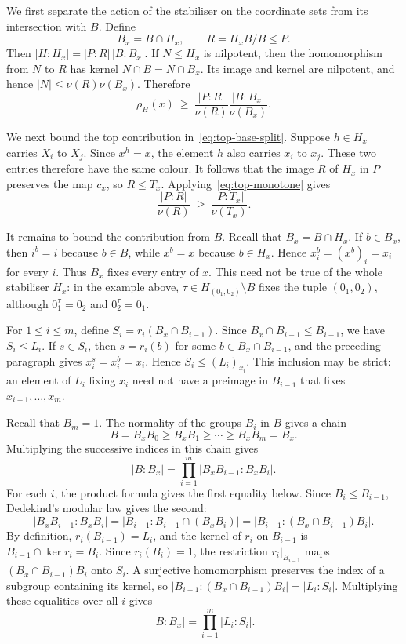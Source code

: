 \documentclass[10pt]{amsart}
\theoremstyle{definition}
\renewcommand{\leq}{\leqslant}
\renewcommand{\geq}{\geqslant}
\let\oldendproof\endproof
\renewenvironment{proof}[1][\proofname]{%
  \oldproof[\bfseries #1]%
}{\oldendproof}
\numberwithin{equation}{section}
\numberwithin{table}{section}
\begin{document}
\begin{proof}
We first separate the action of the stabiliser on the coordinate sets from its
intersection with $B$. Define
$$
  B_x=B\cap H_x,
  \qquad
  R=H_xB/B\leq P.
$$
Then $|H:H_x|=|P:R|\,|B:B_x|$.
If $N\leq H_x$ is nilpotent, then the homomorphism from $N$ to $R$ has
kernel $N\cap B=N\cap B_x$. Its image and kernel are nilpotent, and hence
$|N|\leq\nu(R)\nu(B_x)$. Therefore
\begin{equation}\label{eq:top-base-split}
  \rho_H(x)\ \geq\
  \frac{|P:R|}{\nu(R)}
  \frac{|B:B_x|}{\nu(B_x)}.
\end{equation}

We next bound the top contribution in~\eqref{eq:top-base-split}. Suppose
$h\in H_x$ carries $X_i$ to $X_j$. Since $x^h=x$, the
element $h$ also carries $x_i$ to $x_j$. These two entries therefore have
the same colour. It follows that the image $R$ of $H_x$ in $P$ preserves
the map $c_x$, so $R\leq T_x$. Applying~\eqref{eq:top-monotone} gives
\begin{equation}\label{eq:top-bound}
  \frac{|P:R|}{\nu(R)}
  \ \geq\
  \frac{|P:T_x|}{\nu(T_x)}.
\end{equation}

It remains to bound the contribution from $B$. Recall that
$B_x=B\cap H_x$. If $b\in B_x$, then $i^b=i$ because $b\in B$, while
$x^b=x$ because $b\in H_x$. Hence $x_i^b=(x^b)_i=x_i$ for every $i$.
Thus $B_x$ fixes every entry of $x$. This need not be true of the whole
stabiliser $H_x$: in the example above,
$\tau\in H_{(0_1,0_2)}\setminus B$ fixes the tuple $(0_1,0_2)$, although
$0_1^\tau=0_2$ and $0_2^\tau=0_1$.

For $1\leq i\leq m$, define $S_i=r_i(B_x\cap B_{i-1})$.
Since $B_x\cap B_{i-1}\leq B_{i-1}$, we have $S_i\leq L_i$. If $s\in S_i$,
then $s=r_i(b)$ for some $b\in B_x\cap B_{i-1}$, and the preceding paragraph
gives $x_i^s=x_i^b=x_i$. Hence $S_i\leq(L_i)_{x_i}$. This inclusion may be
strict: an element of $L_i$ fixing $x_i$ need not have a preimage in
$B_{i-1}$ that fixes $x_{i+1},\ldots,x_m$.

Recall that $B_m=1$. The normality of
the groups $B_i$ in $B$ gives a chain
$$
  B=B_xB_0\geq B_xB_1\geq\cdots\geq B_xB_m=B_x.
$$
Multiplying the successive indices in this chain gives
$$
  |B:B_x|=
  \prod_{i=1}^m|B_xB_{i-1}:B_xB_i|.
$$
For each $i$, the product formula gives the first
equality below. Since $B_i\leq B_{i-1}$, Dedekind's modular law gives the
second:
$$
  |B_xB_{i-1}:B_xB_i|
  =|B_{i-1}:B_{i-1}\cap(B_xB_i)|
  =|B_{i-1}:(B_x\cap B_{i-1})B_i|.
$$
By definition, $r_i(B_{i-1})=L_i$, and the kernel of $r_i$ on $B_{i-1}$ is
$B_{i-1}\cap\ker r_i=B_i$. Since $r_i(B_i)=1$, the restriction
$\left.r_i\right|_{B_{i-1}}$ maps $(B_x\cap B_{i-1})B_i$ onto $S_i$. A
surjective homomorphism preserves the index of a subgroup containing its
kernel, so
$|B_{i-1}:(B_x\cap B_{i-1})B_i|=|L_i:S_i|$.
Multiplying these equalities over all $i$ gives
\begin{equation}\label{eq:base-index}
  |B:B_x|=\prod_{i=1}^m|L_i:S_i|.
\end{equation}


\end{proof}
\end{document}
